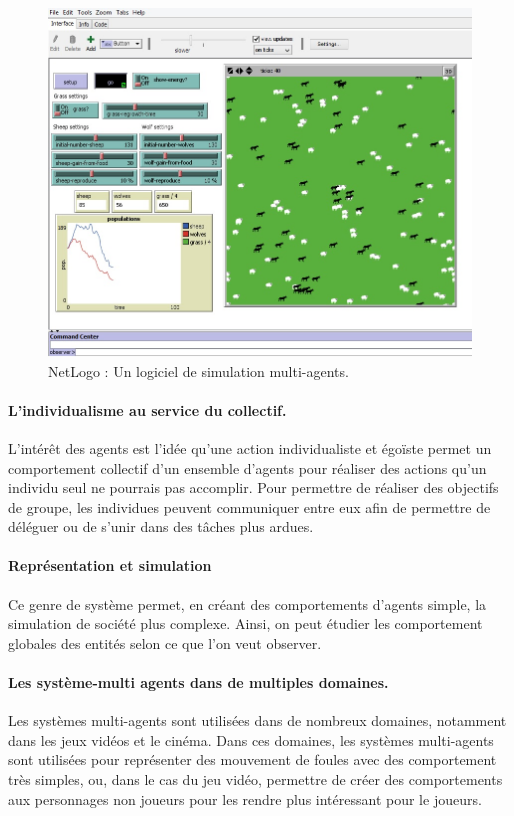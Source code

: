 \documentclass{report}
\begin{document}
\begin{figure}[h]
\centering
\includegraphics[scale=0.65]{NetLogoImage}
\caption{NetLogo : Un logiciel de simulation multi-agents.}
\end{figure}

\paragraph{L'individualisme au service du collectif.}L’intérêt des agents est l'idée qu'une action individualiste et égoïste permet un comportement collectif d'un ensemble d'agents pour réaliser des actions qu'un individu seul ne pourrais pas accomplir. Pour permettre de réaliser des objectifs de groupe, les individues peuvent communiquer entre eux afin de permettre de déléguer ou de s'unir dans des tâches plus ardues.
\paragraph{Représentation et simulation}Ce genre de système permet, en créant des comportements d'agents simple, la simulation de société plus complexe. Ainsi, on peut étudier les comportement globales des entités selon ce que l'on veut observer.
\paragraph{Les système-multi agents dans de multiples domaines.} Les systèmes multi-agents sont utilisées dans de nombreux domaines, notamment dans les jeux vidéos et le cinéma. Dans ces domaines, les systèmes multi-agents  sont utilisées pour représenter des mouvement de foules avec des comportement très simples, ou, dans le cas du jeu vidéo, permettre de créer des comportements aux personnages non joueurs pour les rendre plus intéressant pour le joueurs.
\end{document}
